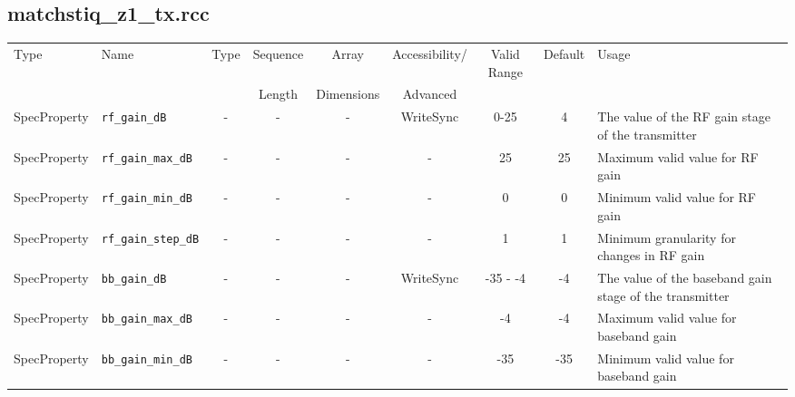 \documentclass{article}
\def\comp{matchstiq\_z1\_tx}
\begin{document}
\begin{landscape}
	\subsection*{\comp.rcc}
	\begin{scriptsize}
		\begin{tabular}{|p{2cm}|p{4cm}|c|c|c|c|c|c|p{6.5cm}|}
			\hline
			\rowcolor{blue}
			Type         & Name                                & Type & Sequence & Array      & Accessibility/ & Valid Range  & Default & Usage                                                                                         \\
			\rowcolor{blue}
			             &                                     &      & Length   & Dimensions & Advanced       &              &         &                                                                                               \\
			\hline
			SpecProperty & \verb+rf_gain_dB+                   & -    & -        & -          & WriteSync      & 0-25         & 4       & The value of the RF gain stage of the transmitter                                             \\
			\hline
			SpecProperty & \verb+rf_gain_max_dB+               & -    & -        & -          & -              & 25           & 25      & Maximum valid value for RF gain                                                               \\
			\hline
			SpecProperty & \verb+rf_gain_min_dB+               & -    & -        & -          & -              & 0            & 0       & Minimum valid value for RF gain                                                               \\
			\hline
			SpecProperty & \verb+rf_gain_step_dB+              & -    & -        & -          & -              & 1            & 1       & Minimum granularity for changes in RF gain                                                    \\
			\hline
			SpecProperty & \verb+bb_gain_dB+                   & -    & -        & -          & WriteSync      & -35 - -4     & -4      & The value of the baseband gain stage of the transmitter                                       \\
			\hline
			SpecProperty & \verb+bb_gain_max_dB+               & -    & -        & -          & -              & -4           & -4      & Maximum valid value for baseband gain                                                         \\
			\hline
			SpecProperty & \verb+bb_gain_min_dB+               & -    & -        & -          & -              & -35          & -35     & Minimum valid value for baseband gain                                                         \\

\end{tabular}
\end{scriptsize}
\end{landscape}
\end{document}
